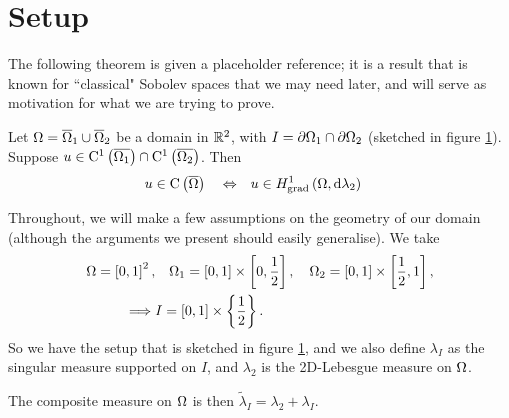 \documentclass[11pt]{report}
\theoremstyle{plain}
\newcommand{\tlambda}{\tilde{\lambda}}
\newcommand{\C}[1]{\mathrm{C}^1\bracs{#1}}
\begin{document}
\section*{Setup}
The following theorem is given a placeholder reference; it is a result that is known for ``classical" Sobolev spaces that we may need later, and will serve as motivation for what we are trying to prove.
\begin{theorem} \label{thm:MeetingThm}
	Let $\Omega = \overline{\Omega}_1 \cup \overline{\Omega}_2$ be a domain in $\mathbb{R}^2$, with $I = \partial\Omega_1 \cap \partial\Omega_2$ (sketched in figure \ref{fig:MeetingSituation}).
	Suppose $u\in \C{\overline{\ddom_1}}\cap \C{\overline{\ddom_2}}$.
	Then
	\begin{align*}
		u\in\mathrm{C}\left( \overline{\Omega} \right) \quad\Leftrightarrow\quad & u\in H^1_\mathrm{grad}\left( \Omega, \mathrm{d}\lambda_2 \right)
	\end{align*}
\end{theorem}

Throughout, we will make a few assumptions on the geometry of our domain (although the arguments we present should easily generalise).
We take 
\begin{align*}
	\Omega = \left[ 0,1 \right]^2, &\quad \Omega_1 = \left[ 0,1 \right]\times\left[ 0,\frac{1}{2} \right],
	\quad \Omega_2 = \left[ 0,1 \right]\times\left[ \frac{1}{2},1 \right], \\
	\implies &I = \left[ 0,1 \right]\times\left\{ \frac{1}{2} \right\}.	
\end{align*}
So we have the setup that is sketched in figure \ref{fig:MeetingSituation}, and we also define $\lambda_I$ as the singular measure supported on $I$, and $\lambda_2$ is the 2D-Lebesgue measure on $\Omega$.
\begin{figure}[h!]
	\centering
	\caption{\label{fig:MeetingSituation}}
\end{figure}
The composite measure on $\Omega$ is then $\tlambda_I = \lambda_2 + \lambda_I$. \newline
\end{document}

